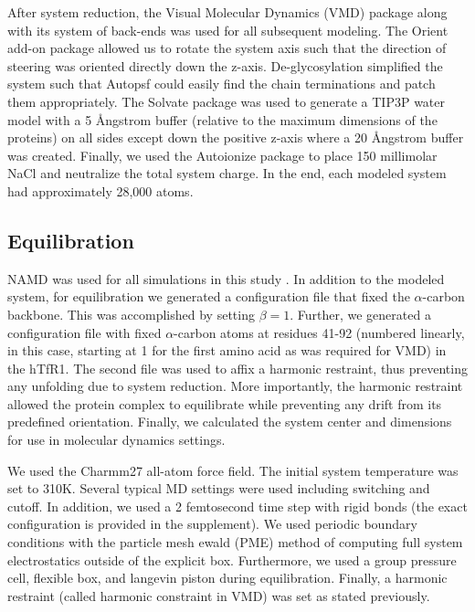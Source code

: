 \documentclass[12pt]{article}
\begin{document}
After system reduction, the Visual Molecular Dynamics (VMD) \citep{Humphrey1996} package along with its system of back-ends was used for all subsequent modeling. The Orient add-on package allowed us to rotate the system axis such that the direction of steering was oriented directly down the z-axis. De-glycosylation simplified the system such that Autopsf could easily find the chain terminations and patch them appropriately. The Solvate package was used to generate a TIP3P water model with a 5 \AA ngstrom buffer (relative to the maximum dimensions of the proteins) on all sides except down the positive z-axis where a 20 \AA ngstrom buffer was created. Finally, we used the Autoionize package to place 150 millimolar NaCl and neutralize the total system charge. In the end, each modeled system had approximately 28,000 atoms.

\subsection*{Equilibration}

NAMD was used for all simulations in this study \citep{Phillips2005}. In addition to the modeled system, for equilibration we generated a configuration file that fixed the $\alpha$-carbon backbone. This was accomplished by setting $\beta = 1$. Further, we generated a configuration file with fixed $\alpha$-carbon atoms at residues 41-92 (numbered linearly, in this case, starting at 1 for the first amino acid as was required for VMD) in the hTfR1. The second file was used to affix a harmonic restraint, thus preventing any unfolding due to system reduction. More importantly, the harmonic restraint allowed the protein complex to equilibrate while preventing any drift from its predefined orientation. Finally, we calculated the system center and dimensions for use in molecular dynamics settings.

We used the Charmm27 \citep{Brooks1983} all-atom force field. The initial system temperature was set to 310K. Several typical MD settings were used including switching and cutoff. In addition, we used a 2 femtosecond time step with rigid bonds (the exact configuration is provided in the supplement). We used periodic boundary conditions with the particle mesh ewald (PME) method of computing full system electrostatics outside of the explicit box. Furthermore, we used a group pressure cell, flexible box, and langevin piston during equilibration. Finally, a harmonic restraint (called harmonic constraint in VMD) was set as stated previously.
\end{document}
